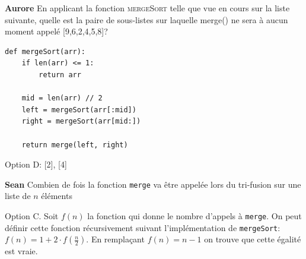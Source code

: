 \begin{Exercice}[5 minutes]\textbf{Aurore}
En applicant la fonction \textsc{mergeSort} telle que vue en cours sur la liste suivante, quelle est la paire de sous-listes sur laquelle merge() ne sera à aucun moment appelé [9,6,2,4,5,8]? 

\begin{lstlisting}[style=pythonstyle, caption={Merge sort — Python}]
def mergeSort(arr):
    if len(arr) <= 1:
        return arr
    
    mid = len(arr) // 2
    left = mergeSort(arr[:mid])
    right = mergeSort(arr[mid:])
    
    return merge(left, right)
\end{lstlisting}

\mcqlist{
    {$[6], [2]$},
    {$[2, 6, 9], [4, 5, 8]$},
    {$[4], [5, 8]$},
    {$[2], [4]$}
}

\begin{solution}
Option D: [2], [4]
\end{solution}
\end{Exercice}







\begin{Exercice}[5 minutes]\textbf{Sean}
Combien de fois la fonction \texttt{merge} va être appelée lors du tri-fusion sur une liste de $n$ éléments  


\begin{solution}
Option C. Soit $f(n)$ la fonction qui donne le nombre d'appels à \texttt{merge}. On peut définir cette fonction récursivement suivant l'implémentation de \texttt{mergeSort}: $f(n) = 1 + 2\cdot f(\frac{n}{2})$. En remplaçant $f(n) = n-1$ on trouve que cette égalité est vraie. 
\end{solution}
\end{Exercice}

